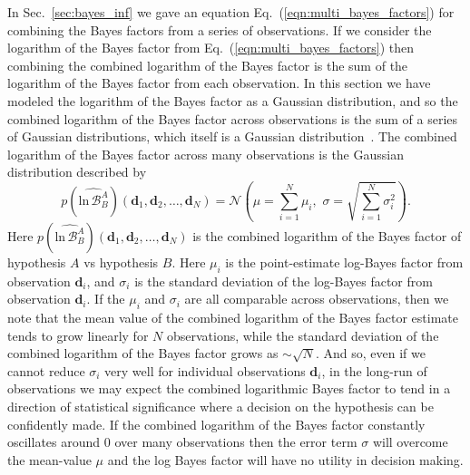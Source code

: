 In Sec.~\ref{sec:bayes_inf} we gave an equation Eq.~(\ref{eqn:multi_bayes_factors}) for combining the Bayes factors from a series of observations. If we consider the logarithm of the Bayes factor from Eq.~(\ref{eqn:multi_bayes_factors}) then combining the combined logarithm of the Bayes factor is the sum of the logarithm of the Bayes factor from each observation. In this section we have modeled the logarithm of the Bayes factor as a Gaussian distribution, and so the combined logarithm of the Bayes factor across observations is the sum of a series of Gaussian distributions, which itself is a Gaussian distribution~\cite{bromiley2003products}. The combined logarithm of the Bayes factor across many observations is the Gaussian distribution described by
\begin{equation}
    p(\widehat{\mathrm{ln} \, \mathcal{B}^A_B}) \left(\mathbf{d}_1, \mathbf{d}_2, \ldots, \mathbf{d}_N \right) = \mathcal{N}\left(\mu = \sum \limits_{i=1}^{N} \mu_i, \, \, \sigma = \sqrt{\sum \limits_{i=1}^{N} \sigma_i^2}\right).
\end{equation} 
Here $p(\widehat{\mathrm{ln} \, \mathcal{B}^A_B}) \left(\mathbf{d}_1, \mathbf{d}_2, \ldots, \mathbf{d}_N \right)$ is the combined logarithm of the Bayes factor of hypothesis $A$ vs hypothesis $B$. Here $\mu_i$ is the point-estimate log-Bayes factor from observation $\mathbf{d}_i$, and $\sigma_i$ is the standard deviation of the log-Bayes factor from observation $\mathbf{d}_i$. If the $\mu_i$ and $\sigma_i$ are all comparable across observations, then we note that the mean value of the combined logarithm of the Bayes factor estimate tends to grow linearly for $N$ observations, while the standard deviation of the combined logarithm of the Bayes factor grows as $\sim \sqrt{N}$. And so, even if we cannot reduce $\sigma_i$ very well for individual observations $\mathbf{d}_i$, in the long-run of observations we may expect the combined logarithmic Bayes factor to tend in a direction of statistical significance where a decision on the hypothesis can be confidently made. If the combined logarithm of the Bayes factor constantly oscillates around $0$ over many observations then the error term $\sigma$ will overcome the mean-value $\mu$ and the log Bayes factor will have no utility in decision making.


